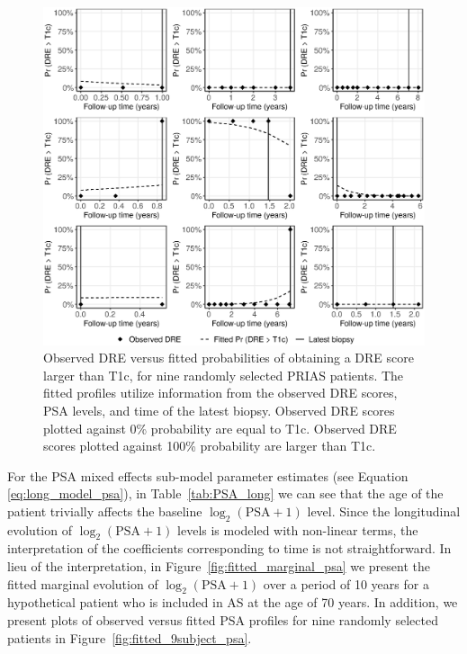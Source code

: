 \begin{figure}[!htb]
\centerline{\includegraphics[width=\columnwidth]{images/fitted_9subject_dre.eps}}
\caption{Observed DRE versus fitted probabilities of obtaining a DRE score larger than T1c, for nine randomly selected PRIAS patients. The fitted profiles utilize information from the observed DRE scores, PSA levels, and time of the latest biopsy. Observed DRE scores plotted against 0\% probability are equal to T1c. Observed DRE scores plotted against 100\% probability are larger than T1c.}
\label{fig:fitted_9subject_dre}
\end{figure}

\clearpage

For the PSA mixed effects sub-model parameter estimates (see Equation \ref{eq:long_model_psa}), in Table~\ref{tab:PSA_long} we can see that the age of the patient trivially affects the baseline $\log_2(\mbox{PSA} + 1)$ level. Since the longitudinal evolution of $\log_2 (\mbox{PSA} + 1)$ levels is modeled with non-linear terms, the interpretation of the coefficients corresponding to time is not straightforward. In lieu of the interpretation, in Figure~\ref{fig:fitted_marginal_psa} we present the fitted marginal evolution of $\log_2 (\mbox{PSA} + 1)$ over a period of 10 years for a hypothetical patient who is included in AS at the age of 70 years. In addition, we present plots of observed versus fitted PSA profiles for nine randomly selected patients in Figure~\ref{fig:fitted_9subject_psa}. 

